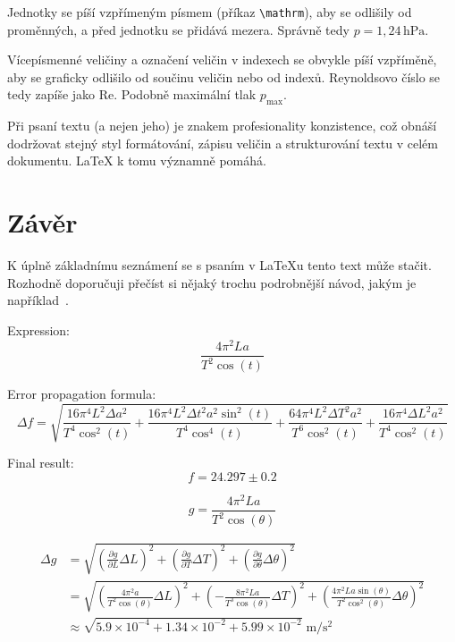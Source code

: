 \documentclass{article}
\begin{document}
		Jednotky se píší vzpřímeným písmem (příkaz \verb+\mathrm+), aby se odlišily od proměn\-ných, a před jednotku se 
		přidává mezera. Správně tedy $p=1,\!24\,\mathrm{hPa}$.

		Vícepísmenné veličiny a označení veličin v indexech se obvykle píší vzpříměně, 
		aby se graficky odlišilo od součinu veličin nebo od indexů.
		Reynoldsovo číslo se tedy zapíše jako $\mathrm{Re}$.
		Podobně maximální tlak $p_{\mathrm{max}}$.
	
		Při psaní textu (a nejen jeho) je znakem profesionality konzistence, 
		což obnáší dodržovat stejný styl formátování, zápisu veličin a strukturování textu v celém dokumentu.
		\LaTeX{} k tomu významně pomáhá.

		\section{Závěr}
		K úplně základnímu seznámení se s psaním v \LaTeX u tento text může stačit.
		Rozhodně doporučuji přečíst si nějaký trochu podrobnější návod, jakým je například~\cite{UvodLaTeX1998}.

Expression:
$$ \frac{4 \pi^{2} L a}{T^{2} \cos{\left(t \right)}} $$

Error propagation formula:
$$ \Delta f = \sqrt{\frac{16 \pi^{4} L^{2} \Delta a^{2}}{T^{4} \cos^{2}{\left(t \right)}} + \frac{16 \pi^{4} L^{2} \Delta t^{2} a^{2} \sin^{2}{\left(t \right)}}{T^{4} \cos^{4}{\left(t \right)}} + \frac{64 \pi^{4} L^{2} \Delta T^{2} a^{2}}{T^{6} \cos^{2}{\left(t \right)}} + \frac{16 \pi^{4} \Delta L^{2} a^{2}}{T^{4} \cos^{2}{\left(t \right)}}} $$

Final result:
$$ f = 24.297 \pm 0.2 $$

\begin{equation}
g = \frac{4 \pi^{2} L a}{T^{2} \cos{\left(\theta \right)}}
\end{equation}

\begin{equation}\begin{aligned}
\Delta g &= \sqrt{\left( \frac{\partial g}{\partial L} \Delta L \right)^2 + \left( \frac{\partial g}{\partial T} \Delta T \right)^2 + \left( \frac{\partial g}{\partial \theta} \Delta \theta \right)^2} \\
&= \sqrt{\left( \frac{4 \pi^{2} a}{T^{2} \cos{\left(\theta \right)}} \Delta L \right)^2 + \left( - \frac{8 \pi^{2} L a}{T^{3} \cos{\left(\theta \right)}} \Delta T \right)^2 + \left( \frac{4 \pi^{2} L a \sin{\left(\theta \right)}}{T^{2} \cos^{2}{\left(\theta \right)}} \Delta \theta \right)^2} \\
&\approx \sqrt{5.9 \times 10^{-4} + 1.34 \times 10^{-2} + 5.99 \times 10^{-2}} \;\mathrm{m/s^2}
\end{aligned}\end{equation}
\end{document}
